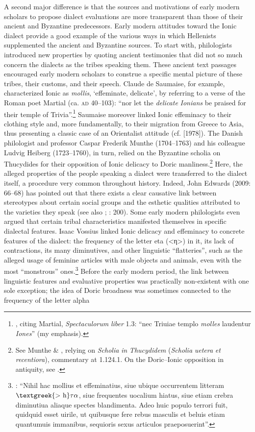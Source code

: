 A second major difference is that the sources and motivations of early modern scholars to propose dialect evaluations are more transparent than those of their ancient and Byzantine predecessors. Early modern attitudes toward the Ionic dialect provide a good example of the various ways in which Hellenists supplemented the ancient and Byzantine sources. To start with, philologists introduced new properties by quoting ancient testimonies that did not so much concern the dialects as the tribes speaking them. These ancient text passages encouraged early modern scholars to construe a specific mental picture of these tribes, their customs, and their speech. Claude de Saumaise, for example, characterized Ionic as \textit{mollis}, ‘effeminate, delicate’, by referring to a verse of the Roman poet Martial (ca. \textsc{ad} 40–103): “nor let the \textit{delicate} \textit{Ionians} be praised for their temple of Trivia”.\footnote{\citet[75]{Saumaise1643a}, citing Martial, \textit{Spectaculorum} \textit{liber} 1.3: “nec Triuiae templo \textit{molles} laudentur \textit{Iones}” (my emphasis).} Saumaise moreover linked Ionic effeminacy to their clothing style and, more fundamentally, to their migration from Greece to Asia, thus presenting a classic case of an Orientalist attitude (cf. \citealt{Said2003} [1978]). The Danish philologist and professor Caspar Frederik Munthe (1704–1763) and his colleague Ludvig Heiberg (1723–1760), in turn, relied on the Byzantine scholia on Thucydides for their opposition of Ionic delicacy to Doric manliness.\footnote{See Munthe \& \citet[15]{Heiberg1748}, relying on \textit{Scholia} \textit{in} \textit{Thucydidem} (\textit{Scholia} \textit{uetera} \textit{et} \textit{recentiora}), commentary at 1.124.1. On the Doric–Ionic opposition in antiquity, see \citet{Cassio1984}.} Here, the alleged properties of the people speaking a dialect were transferred to the dialect itself, a procedure very common throughout history. Indeed, John Edwards (2009: 66–68) has pointed out that there exists a clear causative link between stereotypes about certain social groups and the esthetic qualities attributed to the varieties they speak (see also \citealt{Silverstein2003}; \citealt{Preston2018}: 200). Some early modern philologists even argued that certain tribal characteristics manifested themselves in specific dialectal features. Isaac Vossius linked Ionic delicacy and effeminacy to concrete features of the dialect: the frequency of the letter eta (<η>) in it, its lack of contractions, its many diminutives, and other linguistic “flatteries”, such as the alleged usage of feminine articles with male objects and animals, even with the most “monstrous” ones.\footnote{\citet[55]{Vossius1673}: “Nihil hac mollius et effeminatius, siue ubique occurrentem litteram $\text{\textgreek{>~h}}\tau \alpha $, siue frequentes uocalium hiatus, siue etiam crebra diminutiua aliaque spectes blandimenta. Adeo huic populo terrori fuit, quidquid esset uirile, ut quibusque fere rebus masculis et beluis etiam quantumuis immanibus, sequioris sexus articulos praeposuerint”.} Before the early modern period, the link between linguistic features and evaluative properties was practically non-existent with one sole exception; the idea of Doric broadness was sometimes connected to the frequency of the letter alpha 